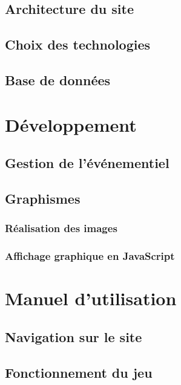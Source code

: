 \documentclass[12pt]{report}
\begin{document}
    \section{Architecture du site}
    
    \section{Choix des technologies}
    
    \section{Base de données}
    
\chapter{Développement}
    
    \section{Gestion de l'événementiel}
    
    \section{Graphismes}
        
        \subsection{Réalisation des images}
        
        \subsection{Affichage graphique en JavaScript}
    
\chapter{Manuel d'utilisation}

    \section{Navigation sur le site}
    
    \section{Fonctionnement du jeu}
    
\end{document}
